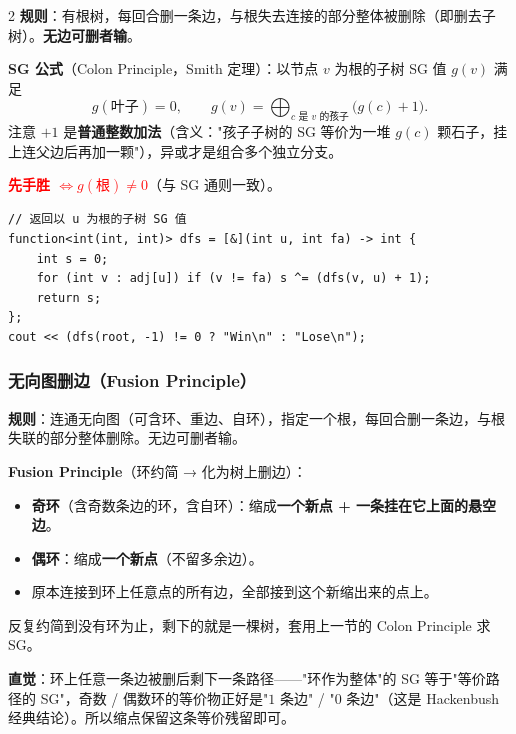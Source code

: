 \begin{multicols*}{2}
		\textbf{规则}：有根树，每回合删一条边，与根失去连接的部分整体被删除（即删去子树）。\textbf{无边可删者输}。

		\textbf{SG 公式}（Colon Principle，Smith 定理）：以节点 $v$ 为根的子树 SG 值 $g(v)$ 满足
		\[
			g(\text{叶子}) = 0,\qquad g(v) = \bigoplus_{c \text{ 是 } v \text{ 的孩子}} \bigl(g(c) + 1\bigr).
		\]
		注意 $+1$ 是\textbf{普通整数加法}（含义："孩子子树的 SG 等价为一堆 $g(c)$ 颗石子，挂上连父边后再加一颗"），异或才是组合多个独立分支。

		\textcolor{red}{\textbf{先手胜 $\iff g(\text{根}) \neq 0$}}（与 SG 通则一致）。

		\begin{verbatim}
// 返回以 u 为根的子树 SG 值
function<int(int, int)> dfs = [&](int u, int fa) -> int {
    int s = 0;
    for (int v : adj[u]) if (v != fa) s ^= (dfs(v, u) + 1);
    return s;
};
cout << (dfs(root, -1) != 0 ? "Win\n" : "Lose\n");
		\end{verbatim}

		\subsubsection{无向图删边（Fusion Principle）}

		\textbf{规则}：连通无向图（可含环、重边、自环），指定一个根，每回合删一条边，与根失联的部分整体删除。无边可删者输。

		\textbf{Fusion Principle}（环约简 → 化为树上删边）：
		\begin{itemize}
			\item \textbf{奇环}（含奇数条边的环，含自环）：缩成\textbf{一个新点 + 一条挂在它上面的悬空边}。
			\item \textbf{偶环}：缩成\textbf{一个新点}（不留多余边）。
			\item 原本连接到环上任意点的所有边，全部接到这个新缩出来的点上。
		\end{itemize}

		反复约简到没有环为止，剩下的就是一棵树，套用上一节的 Colon Principle 求 SG。

		\textbf{直觉}：环上任意一条边被删后剩下一条路径——"环作为整体"的 SG 等于"等价路径的 SG"，奇数 / 偶数环的等价物正好是"$1$ 条边" / "$0$ 条边"（这是 Hackenbush 经典结论）。所以缩点保留这条等价残留即可。

	\end{multicols*}

